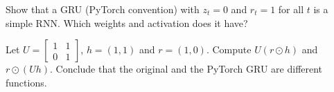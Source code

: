 \begin{notechapter}
\begin{exercise}\label{gated-rnn:exr:4}
Show that a GRU (PyTorch convention) with $z_t = 0$ and $r_t = 1$ for all $t$ is a simple RNN. Which
weights and activation does it have?
\end{exercise}

\begin{exercise}\label{gated-rnn:exr:gru}
Let $U = \begin{bmatrix}1 & 1\\ 0 & 1\end{bmatrix}$, $h = (1, 1)$ and $r = (1, 0)$. Compute $U(r\odot h)$ and $r\odot(Uh)$. Conclude that the original and
the PyTorch GRU are different functions.
\end{exercise}
\end{notechapter}
